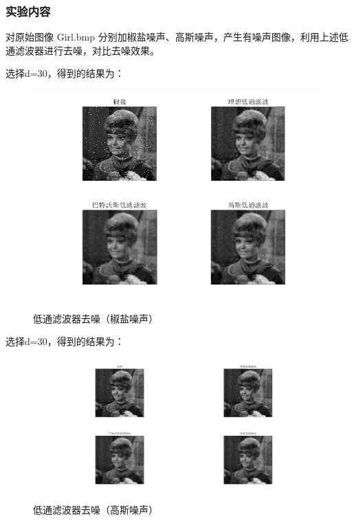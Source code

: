 \documentclass{ctexart}
\begin{document}
\subsubsection{\hei 实验内容}
对原始图像 Girl.bmp 分别加椒盐噪声、高斯噪声，产生有噪声图像，利用上述低
通滤波器进行去噪，对比去噪效果。
\par 选择d=30，得到的结果为：
\begin{figure}[H]
    \centering
    \includegraphics[scale=0.6]{4_6_1.png}
    \caption{低通滤波器去噪（椒盐噪声）}
\end{figure}
\par 选择d=30，得到的结果为：
\begin{figure}[H]
    \centering
    \includegraphics[scale=0.3]{4_6_2.png}
    \caption{低通滤波器去噪（高斯噪声）}
\end{figure}
\end{document}
